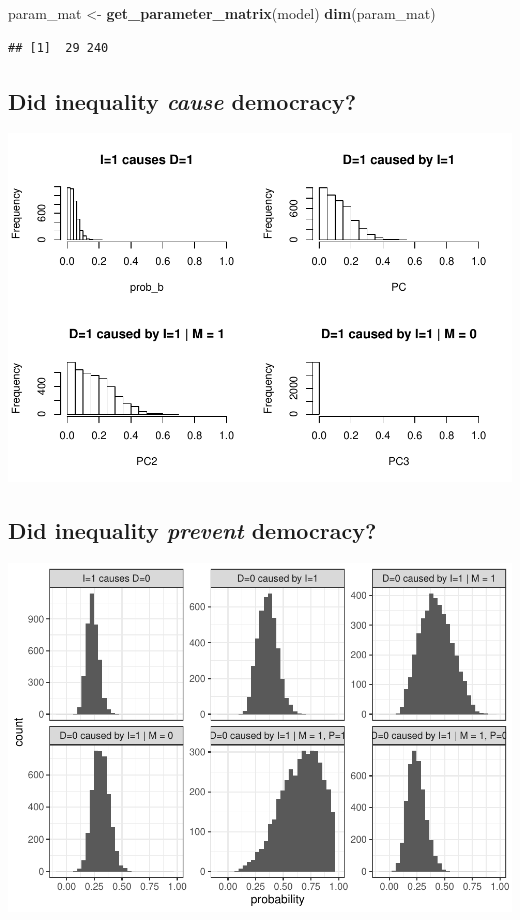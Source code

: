 \documentclass[12pt,]{book}
\newenvironment{Shaded}{\begin{snugshade}}{\end{snugshade}}
\newcommand{\KeywordTok}[1]{\textcolor[rgb]{0.13,0.29,0.53}{\textbf{#1}}}
\newcommand{\NormalTok}[1]{#1}
\newcommand{\StringTok}[1]{\textcolor[rgb]{0.31,0.60,0.02}{#1}}
\begin{document}
\begin{Shaded}
\begin{Highlighting}[]
\NormalTok{param_mat <-}\StringTok{ }\KeywordTok{get_parameter_matrix}\NormalTok{(model)}
\KeywordTok{dim}\NormalTok{(param_mat)}
\end{Highlighting}
\end{Shaded}

\begin{verbatim}
## [1]  29 240
\end{verbatim}

\hypertarget{did-inequality-cause-democracy}{%
\subsection{\texorpdfstring{Did inequality \emph{cause} democracy?}{Did inequality cause democracy?}}\label{did-inequality-cause-democracy}}

\includegraphics{ii_files/figure-latex/mixedhet-1.pdf}

\hypertarget{did-inequality-prevent-democracy}{%
\subsection{\texorpdfstring{Did inequality \emph{prevent} democracy?}{Did inequality prevent democracy?}}\label{did-inequality-prevent-democracy}}

\includegraphics{ii_files/figure-latex/mixedhist2-1.pdf}
\end{document}
